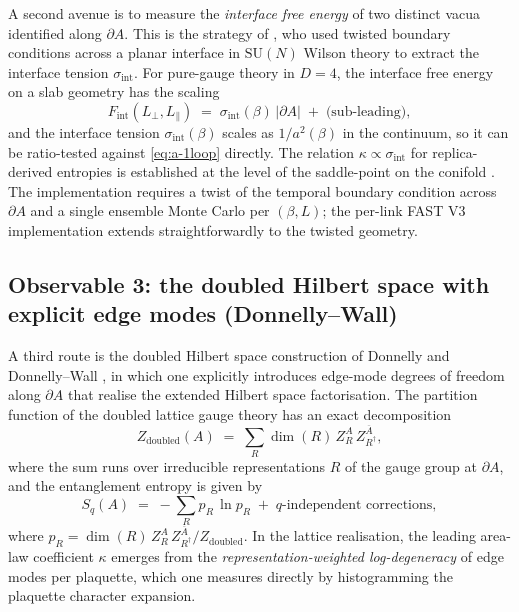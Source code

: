 \documentclass[11pt,a4paper]{article}
\theoremstyle{definition}
\newcommand{\bA}{\overline{A}}
\newcommand{\SUN}{\mathrm{SU}(N)}
\begin{document}
A second avenue is to measure the \emph{interface free energy} of
two distinct vacua identified along $\partial A$. This is the
strategy of \cite{LuciniTeperWenger2005}, who used twisted boundary
conditions across a planar interface in $\SUN$ Wilson theory to
extract the interface tension $\sigma_{\mathrm{int}}$. For pure-gauge
theory in $D=4$, the interface free energy on a slab geometry has the
scaling
\begin{equation}
   F_{\mathrm{int}}(L_{\perp}, L_{\parallel})
   \;=\; \sigma_{\mathrm{int}}(\beta) \,|\partial A|
         \;+\; \text{(sub-leading)},
\end{equation}
and the interface tension $\sigma_{\mathrm{int}}(\beta)$ scales as
$1/a^{2}(\beta)$ in the continuum, so it can be ratio-tested
against \eqref{eq:a-1loop} directly. The relation
$\kappa \propto \sigma_{\mathrm{int}}$ for replica-derived entropies
is established at the level of the saddle-point on the conifold
\cite{Solodukhin2011}. The implementation requires a twist of the
temporal boundary condition across $\partial A$ and a single
ensemble Monte Carlo per $(\beta, L)$; the per-link FAST V3
implementation extends straightforwardly to the twisted geometry.

\subsection{Observable 3: the doubled Hilbert space with explicit
edge modes (Donnelly--Wall)}
\label{sec:doubled}

A third route is the doubled Hilbert space construction of Donnelly
\cite{Donnelly2012} and Donnelly--Wall
\cite{DonnellyWall2014,DonnellyWall2015}, in which one explicitly
introduces edge-mode degrees of freedom along $\partial A$ that
realise the extended Hilbert space factorisation. The partition
function of the doubled lattice gauge theory has an exact
decomposition
\begin{equation}
   Z_{\mathrm{doubled}}(A) \;=\;
   \sum_{R} \dim(R)\,Z_{R}^{A}\,Z_{R^{\dagger}}^{\bA},
\end{equation}
where the sum runs over irreducible representations $R$ of the gauge
group at $\partial A$, and the entanglement entropy is given by
\begin{equation}
   S_{q}(A) \;=\; -\sum_{R} p_{R}\,\ln p_{R} \;+\;
                  q\text{-independent corrections},
\end{equation}
where $p_{R} = \dim(R)\,Z_{R}^{A}\,Z_{R^{\dagger}}^{\bA}/
Z_{\mathrm{doubled}}$. In the lattice realisation, the leading
area-law coefficient $\kappa$ emerges from the
\emph{representation-weighted log-degeneracy} of edge modes per
plaquette, which one measures directly by histogramming the
plaquette character expansion.
\end{document}

